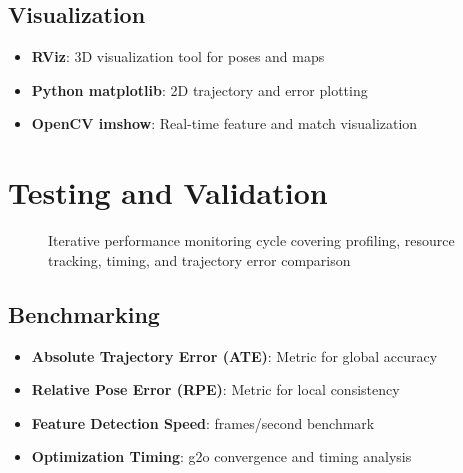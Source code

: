 \subsection{Visualization}
\begin{itemize}
    \item \textbf{RViz}: 3D visualization tool for poses and maps
    \item \textbf{Python matplotlib}: 2D trajectory and error plotting
    \item \textbf{OpenCV imshow}: Real-time feature and match visualization
\end{itemize}

\section{Testing and Validation}

\begin{figure}[H]
	\centering
	\caption{Iterative performance monitoring cycle covering profiling, resource tracking, timing, and trajectory error comparison}
	\label{fig:performance-cycle}
\end{figure}
\subsection{Benchmarking}
\begin{itemize}
    \item \textbf{Absolute Trajectory Error (ATE)}: Metric for global accuracy
    \item \textbf{Relative Pose Error (RPE)}: Metric for local consistency
    \item \textbf{Feature Detection Speed}: frames/second benchmark
    \item \textbf{Optimization Timing}: g2o convergence and timing analysis
\end{itemize}

